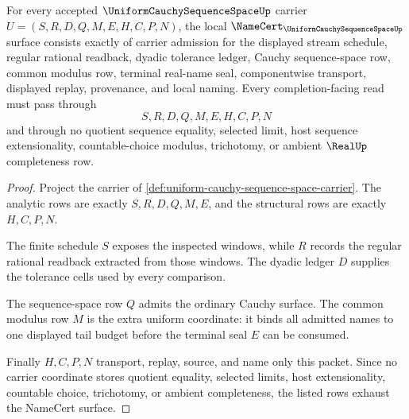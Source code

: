 \begin{theorem}
\label{thm:uniform-cauchy-sequence-space-obligations}
For every accepted $\UniformCauchySequenceSpaceUp$ carrier $U=(S,R,D,Q,M,E,H,C,P,N)$, the local $\NameCert_{\UniformCauchySequenceSpaceUp}$ surface consists exactly of carrier admission for the displayed stream schedule, regular rational readback, dyadic tolerance ledger, Cauchy sequence-space row, common modulus row, terminal real-name seal, componentwise transport, displayed replay, provenance, and local naming. Every completion-facing read must pass through
$$
S,R,D,Q,M,E,H,C,P,N
$$
and through no quotient sequence equality, selected limit, host sequence extensionality, countable-choice modulus, trichotomy, or ambient $\RealUp$ completeness row.
\end{theorem}
\begin{proof}
Project the carrier of \autoref{def:uniform-cauchy-sequence-space-carrier}. The analytic rows are exactly $S,R,D,Q,M,E$, and the structural rows are exactly $H,C,P,N$.

The finite schedule $S$ exposes the inspected windows, while $R$ records the regular rational readback extracted from those windows. The dyadic ledger $D$ supplies the tolerance cells used by every comparison.

The sequence-space row $Q$ admits the ordinary Cauchy surface. The common modulus row $M$ is the extra uniform coordinate: it binds all admitted names to one displayed tail budget before the terminal seal $E$ can be consumed.

Finally $H,C,P,N$ transport, replay, source, and name only this packet. Since no carrier coordinate stores quotient equality, selected limits, host extensionality, countable choice, trichotomy, or ambient completeness, the listed rows exhaust the NameCert surface.
\end{proof}


